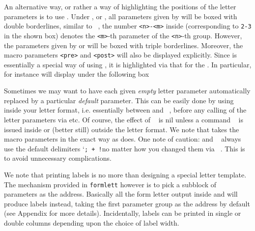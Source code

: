 {An alternative way, or rather a way of highlighting the positions
of the letter parameters is to use {\tt\string\preview}. Under
{\tt\string\preview}, or {\tt \string\previewtrue}, all
parameters given by {\tt\string\paras[<m>][<n>]} will be boxed
with double borderlines, similar to {\tt \previewtrue
\paras[3][2]}, the number {\tt<n>-<m>} inside (corresponding to
{\tt 2-3} in the shown box) denotes the {\tt<m>}-th parameter of
the {\tt <n>}-th group. However, the parameters given by
{\tt\string\blockparas} or {\tt\string\addressparas} will be
boxed with triple borderlines. Moreover, the macro parameters
{\tt<pre>} and {\tt <post>} will also be displayed explicitly.
Since {\tt\string\addressparas} is essentially a special way of
using {\tt\string\blockparas}, it is highlighted via that for the
{\tt\string\blockparas}. In particular,
{\tt\string\blockparas[3][6][\string\x][\string\y]} for instance
will display under {\tt \string\preview} the following box

\smallskip
{\previewtrue  \blockparas[3][6][\x][\y]}


\medskip

Sometimes we may want to have each given {\sl empty} letter
parameter automatically replaced by a particular {\sl default}
parameter. This can be easily done by using {\tt
\string\loaddefaultparas} inside your letter format, i.e.
essentially between {\tt \string\beginletter} and {\tt
\string\endletter}, before any calling of the letter parameters
via {\tt \string\paras} etc.  Of course, the effect of {\tt
\string\loaddefaultparas} is nil unless a command {\tt
\string\paradefaults} is issued inside or (better still) outside
the letter format. We note that {\tt \string\paradefaults} takes
the macro parameters in the exact way as {\tt \string\paranames}
does. One note of caution: {\tt \string\paradefaults} and {\tt
\string\paranames} always use the default delimiters \lq{\tt ; +
!}\rqs no matter how you changed them via {\tt
\string\delimiters}. This is to avoid unnecessary complications.

\medskip

We note that printing labels is no more than designing a special
letter template. The mechanism provided in {\tt formlett} however
is to pick a subblock of parameters as the address. Basically all
the form letter output inside {\tt\string\beginlabels} and
{\tt\string\endlabels} will produce labels instead, taking the
first parameter group as the address by default (see Appendix for
more details). Incidentally, labels can be printed in single or
double columns depending upon the choice of label width.

}
